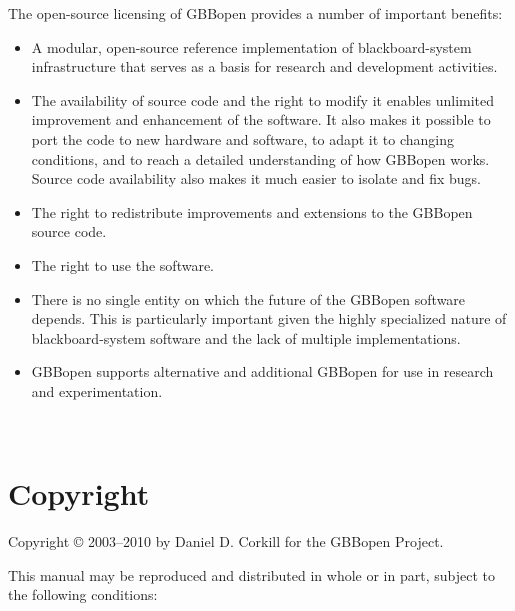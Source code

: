 \documentclass[10pt,twoside,english,pdftex]{article}
\begin{document}
{The open-source licensing of GBBopen provides a number of important benefits:
\begin{itemize}
\item A modular, open-source reference implementation of
  blackboard-system infrastructure that serves as a basis for research
  and development activities.
\item The availability of source code and the right to modify it
  enables unlimited improvement and enhancement of the software. It
  also makes it possible to port the code to new hardware and
  software, to adapt it to changing conditions, and to reach a
  detailed understanding of how GBBopen works. Source code
  availability also makes it much easier to isolate and fix bugs.
\item The right to redistribute improvements and extensions to the
  GBBopen source code.
\item The right to use the software.
\item There is no single entity on which the future of the GBBopen
  software depends. This is particularly important given the highly
  specialized nature of blackboard-system software and the lack of
  multiple implementations.
\item GBBopen supports alternative and additional GBBopen  for
  use in research and experimentation.
\end{itemize}
}%


\T\begin{ifhtml} 
  \intro
  \setcounter{htmlautomenu}{0}
\T\end{ifhtml}

\T\thispagestyle{empty}


\T\newpage
\T~
\T\vfill
\W{}
\W\section*{Copyright}

Copyright \copyright{} 2003--2010 by Daniel D. Corkill for the
GBBopen Project.

This manual may be reproduced and distributed in whole or in
part, subject to the following conditions: 
\end{document}
